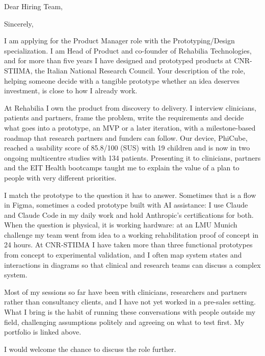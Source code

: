 \documentclass[11pt,a4paper,sans]{moderncv}
\begin{document}

\opening{Dear Hiring Team,}
\closing{Sincerely,}
\makelettertitle

I am applying for the Product Manager role with the Prototyping/Design specialization. I am Head of Product and co-founder of Rehabilia Technologies, and for more than five years I have designed and prototyped products at CNR-STIIMA, the Italian National Research Council. Your description of the role, helping someone decide with a tangible prototype whether an idea deserves investment, is close to how I already work.

At Rehabilia I own the product from discovery to delivery. I interview clinicians, patients and partners, frame the problem, write the requirements and decide what goes into a prototype, an MVP or a later iteration, with a milestone-based roadmap that research partners and funders can follow. Our device, PhiCube, reached a usability score of 85.8/100 (SUS) with 19 children and is now in two ongoing multicentre studies with 134 patients. Presenting it to clinicians, partners and the EIT Health bootcamps taught me to explain the value of a plan to people with very different priorities.

I match the prototype to the question it has to answer. Sometimes that is a flow in Figma, sometimes a coded prototype built with AI assistance: I use Claude and Claude Code in my daily work and hold Anthropic's certifications for both. When the question is physical, it is working hardware: at an LMU Munich challenge my team went from idea to a working rehabilitation proof of concept in 24 hours. At CNR-STIIMA I have taken more than three functional prototypes from concept to experimental validation, and I often map system states and interactions in diagrams so that clinical and research teams can discuss a complex system.

Most of my sessions so far have been with clinicians, researchers and partners rather than consultancy clients, and I have not yet worked in a pre-sales setting. What I bring is the habit of running these conversations with people outside my field, challenging assumptions politely and agreeing on what to test first. My portfolio is linked above.

I would welcome the chance to discuss the role further.

\makeletterclosing
\end{document}

